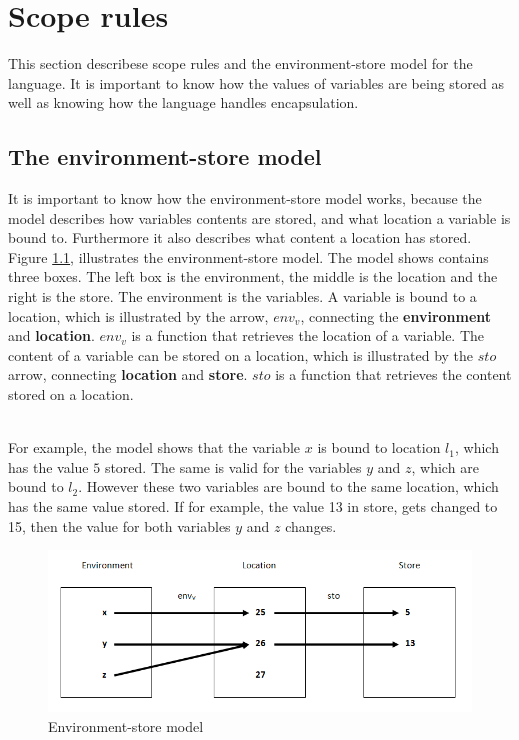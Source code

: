 \chapter{Scope rules}\label{chap:scope-rules}
This section describese scope rules and the environment-store model for the language. It is important to know how the values of variables are being stored as well as knowing how the language handles encapsulation. 

\section{The environment-store model}\label{sec:es-model}
It is important to know how the environment-store model works, because the model describes how variables contents are stored, and what location a variable is bound to. Furthermore it also describes what content a location has stored. Figure \ref{fig:esmodel}, illustrates the environment-store model. The model shows contains three boxes. The left box is the environment, the middle is the location and the right is the store. The environment is the variables. A variable is bound to a location, which is illustrated by the arrow, $env_v$, connecting the \textbf{environment} and \textbf{location}. $env_v$ is a function that retrieves the location of a variable. The content of a variable can be stored on a location, which is illustrated by the $sto$ arrow, connecting \textbf{location} and \textbf{store}. $sto$ is a function that retrieves the content stored on a location. 

\\For example, the model shows that the variable $x$ is bound to location $l_{1}$, which has the value $5$ stored. The same is valid for the variables $y$ and $z$, which are bound to $l_{2}$. However these two variables are bound to the same location, which has the same value stored. If for example, the value 13 in store, gets changed to 15, then the value for both variables $y$ and $z$ changes. 
\begin{figure}[H]
\includegraphics{billeder/environment_store_model.png}
\caption{Environment-store model}
\label{fig:esmodel}
\end{figure}



